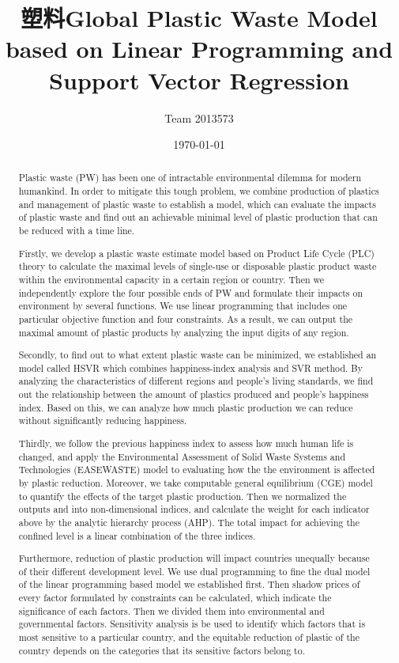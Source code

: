 \documentclass{mcmthesis}
\title{塑料Global Plastic Waste Model based on Linear Programming and Support Vector Regression}
\author{Team 2013573}
\date{\today}
\begin{document}
\begin{abstract}

Plastic waste (PW) has been one of intractable environmental dilemma for modern humankind. In order to mitigate this tough problem, we combine production of plastics and management of plastic waste to establish a model, which can evaluate the impacts of plastic waste and find out an achievable minimal level of plastic production that can be reduced with a time line.  

Firstly, we develop a plastic waste estimate model based on Product Life Cycle (PLC) theory to calculate the maximal levels of single-use or disposable plastic product waste within the environmental capacity in a certain region or country. Then we independently explore the four possible ends of PW and formulate their impacts on environment by several functions. We use linear programming that includes one particular objective function and four constraints. As a result, we can output the maximal amount of plastic products by analyzing the input digits of any region. 

Secondly, to find out to what extent plastic waste can be minimized, we established an model called HSVR which combines happiness-index analysis and SVR method. By analyzing the characteristics of different regions and people’s living standards, we find out the relationship between the amount of plastics produced and people’s happiness index. Based on this, we can analyze how much plastic production we can reduce without significantly reducing happiness.

Thirdly, we follow the previous happiness index to assess how much human life is changed, and apply the Environmental Assessment of Solid Waste Systems and Technologies (EASEWASTE) model to evaluating how the the environment is affected by plastic reduction. Moreover, we take computable general equilibrium (CGE) model to quantify the effects of the target plastic production. Then we normalized the outputs and into non-dimensional indices, and calculate the weight for each indicator above by the analytic hierarchy process (AHP). The total impact for achieving the confined level is a linear combination of the three indices. 

Furthermore, reduction of plastic production will impact countries unequally because of their different development level. We use dual programming to fine the dual model of the linear programming based model we established first. Then shadow prices of every factor formulated by constraints can be calculated, which indicate the significance of each factors. Then we divided them into environmental and governmental factors. Sensitivity analysis is be used to identify which factors that is most sensitive to a particular country, and the equitable reduction of plastic of the country depends on the categories that its sensitive factors belong to. 


\end{abstract}
\end{document}
